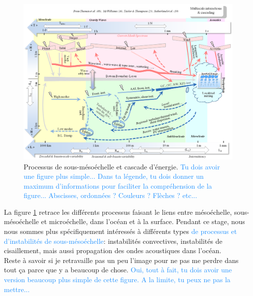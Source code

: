 \documentclass{rapportECC}
\newcommand{\FAadd}[1]{\textcolor{DodgerBlue}{{#1}}}                     %
\begin{document}
\begin{figure}[H]
    \centering
    \includegraphics[width=1
    \textwidth]{images/sous_meso.png}
    \caption{Processus de sous-mésoéchelle et cascade d'énergie. \FAadd{Tu dois avoir une figure plus simple... Dans ta légende, tu dois donner un maximum d'informations pour faciliter la compréhension de la figure... Abscisses, ordonnées ? Couleurs ? Flèches ? etc...}}
    \label{fig:echelles}
\end{figure}

La figure \ref{fig:echelles} retrace les différents processus faisant le liens entre mésoéchelle, sous-mésoéchelle et microéchelle, dans l'océan et à la surface. Pendant ce stage, nous nous sommes plus spécifiquement intéressés à différents types \FAadd{de processus et d'instabilités de sous-mésoéchelle}: instabilités convectives, instabilités de cisaillement, mais aussi propagation des ondes acoustiques dans l'océan.
\\
Reste à savoir si je retravaille pas un peu l'image pour ne pas me perdre dans tout ça parce que y a beaucoup de chose. \FAadd{Oui, tout à fait, tu dois avoir une version beaucoup plus simple de cette figure. A la limite, tu peux ne pas la mettre...}
\end{document}
